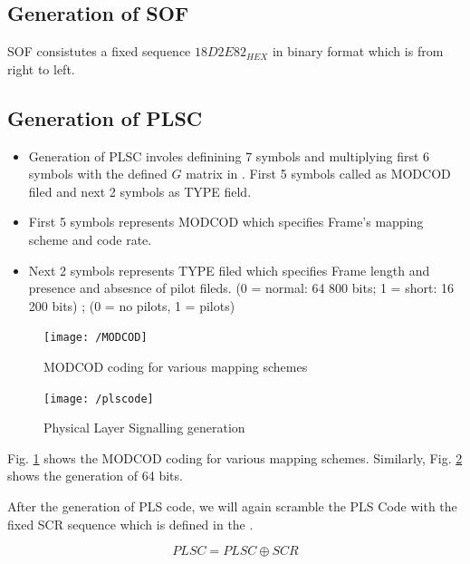 \documentclass[journal,12pt,twocolumn]{IEEEtran}
\begin{document}
\subsection{Generation of SOF}
SOF consistutes a fixed sequence $18D2E82_{HEX}$ in binary format which is from right to left.
\subsection{Generation of PLSC}
\begin{itemize}
\item Generation of PLSC involes definining 7 symbols and multiplying first 6 symbols with the defined $G$ matrix in \cite{dvb}. First 5 symbols called as MODCOD filed and next 2 symbols as TYPE field.
\item First 5 symbols represents MODCOD which specifies Frame's mapping scheme and code rate.
\item Next 2 symbols represents TYPE filed which specifies Frame length and presence and absesnce of pilot fileds.
(0 = normal: 64 800 bits; 1 = short: 16 200 bits) ; (0 = no pilots, 1 = pilots)
\end{itemize}
%
\begin{figure}
\begin{center}
\texttt{[image: /MODCOD]}
\end{center}
\caption{MODCOD coding for various mapping schemes}
\label{fig:modcod}
\end{figure}
%
%
\begin{figure}
\begin{center}
\texttt{[image: /plscode]}
\end{center}
\caption{Physical Layer Signalling generation}
\label{fig:pls gen}
\end{figure}
%
 Fig. \ref{fig:modcod} shows the MODCOD coding for various mapping schemes. Similarly, Fig. \ref{fig:pls gen} shows the generation of 64 bits.
 
 After the generation of PLS code, we will again scramble the PLS Code with the fixed SCR sequence which is defined in the \cite{dvb}.
 
\begin{equation}
PLSC=PLSC \oplus SCR
\end{equation}
\end{document}
